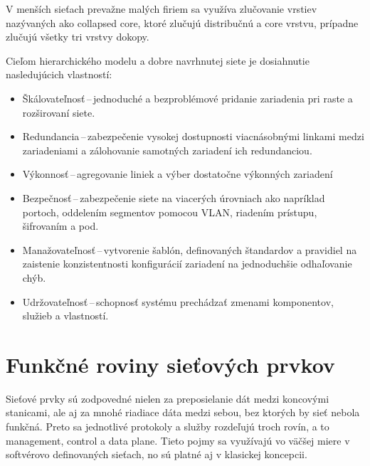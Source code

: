 \noindent
\vspace{2em}
V menších sieťach prevažne malých firiem sa využíva zlučovanie vrstiev nazývaných ako collapsed core, ktoré zlučujú distribučnú a core vrstvu, prípadne zlučujú všetky tri vrstvy dokopy. 

\noindent
Cieľom hierarchického modelu a dobre navrhnutej siete je dosiahnutie nasledujúcich vlastností:

\begin{itemize}
	\item Škálovateľnosť\,--\,jednoduché a bezproblémové pridanie zariadenia pri raste a rozširovaní siete.
	\item Redundancia\,--\,zabezpečenie vysokej dostupnosti viacnásobnými linkami medzi zariadeniami a zálohovanie samotných zariadení ich redundanciou.
	\item Výkonnosť\,--\,agregovanie liniek a výber dostatočne výkonných zariadení
	\item Bezpečnosť\,--\,zabezpečenie siete na viacerých úrovniach ako napríklad portoch, oddelením segmentov pomocou VLAN, riadením prístupu, šifrovaním a pod.
	\item Manažovateľnosť\,--\,vytvorenie šablón, definovaných štandardov a pravidiel na zaistenie konzistentnosti konfigurácií zariadení na jednoduchšie odhaľovanie chýb. 
	\item Udržovateľnosť\,--\,schopnosť systému prechádzať zmenami komponentov, služieb a vlastností.
\end{itemize}



\section{Funkčné roviny sieťových prvkov}
Sieťové prvky sú zodpovedné nielen za preposielanie dát medzi koncovými stanicami, ale aj za mnohé riadiace dáta medzi sebou, bez ktorých by sieť nebola funkčná. Preto sa jednotlivé protokoly a služby rozdeľujú troch rovín, a to management, control a data plane. Tieto pojmy sa využívajú vo väčšej miere v softvérovo definovaných sieťach, no sú platné aj v klasickej koncepcii.
 
